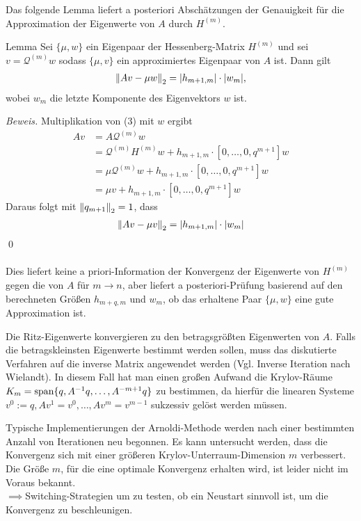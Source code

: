 Das folgende Lemma liefert a posteriori Abschätzungen der Genauigkeit für die Approximation der Eigenwerte von $A$ durch 
$H^{(m)}$.
\begin{thmbox}{Lemma}
  Sei $\{\mu,w\}$ ein Eigenpaar der Hessenberg-Matrix $H^{(m)}$ und sei $v=\mathcal{Q}^{(m)}w$ sodass $\{\mu,v\}$ ein 
  approximiertes Eigenpaar von $A$ ist. Dann gilt
  \begin{align*}\vertn{2}{Av-\mu w}_2 = |h_{m+1,m}|\cdot |w_m|,\end{align*} 
  wobei $w_m$ die letzte Komponente des Eigenvektors $w$ ist.
\end{thmbox}
\textit{Beweis.} Multiplikation von (3) mit $w$ ergibt 
\begin{align*}
Av &= A\mathcal{Q}^{(m)}w\\ 
&= \mathcal{Q}^{(m)}H^{(m)}w + h_{m+1,m}\cdot[0,\dots,0,q^{m+1}]w \\
&= \mu \mathcal{Q}^{(m)}w + h_{m+1,m}\cdot[0,\dots,0,q^{m+1}]w \\
&= \mu v + h_{m+1,m}\cdot[0,\dots,0,q^{m+1}]w
\end{align*}
Daraus folgt mit $\vertn{2}{q_{m+1}}_2 = 1$, dass
\begin{align*}\vertn{2}{Av-\mu v}_2 = |h_{m+1,m}|\cdot |w_m|\end{align*}
\qed \\ \\
Dies liefert keine a priori-Information der Konvergenz der Eigenwerte von $H^{(m)}$ gegen die von $A$ für $m\to n$, aber
liefert a posteriori-Prüfung basierend auf den berechneten Größen $h_{m+q,m}$ und $w_m$, ob das erhaltene Paar 
$\{\mu,w\}$ eine gute Approximation ist.
\begin{rembox}
  Die Ritz-Eigenwerte konvergieren zu den betragsgrößten Eigenwerten von $A$. Falls die betragskleinsten Eigenwerte 
  bestimmt werden sollen, muss das diskutierte Verfahren auf die inverse Matrix angewendet werden (Vgl. Inverse 
  Iteration nach Wielandt). In diesem Fall hat man einen großen Aufwand die Krylov-Räume 
  $K_m = \text{span}\{q,A^{-1}q,\dots,A^{-m+1}q\}$ zu bestimmen, da hierfür die linearen Systeme $v^0:=q, Av^1=v^0, 
  \dots, Av^m=v^{m-1}$ sukzessiv gelöst werden müssen.
\end{rembox}
\begin{rembox}
  Typische Implementierungen der Arnoldi-Methode werden nach einer bestimmten Anzahl von Iterationen neu begonnen.
  Es kann untersucht werden, dass die Konvergenz sich mit einer größeren Krylov-Unterraum-Dimension $m$ verbessert.
  Die Größe $m$, für die eine optimale Konvergenz erhalten wird, ist leider nicht im Voraus bekannt. \\
  $\implies$\glqq{}Switching\grqq{}-Strategien um zu testen, ob ein Neustart sinnvoll ist, 
  um die Konvergenz zu beschleunigen.
\end{rembox}
